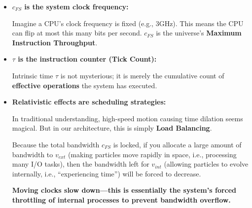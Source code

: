 \begin{itemize}
\item \textbf{$c_{FS}$ is the system clock frequency:}

    Imagine a CPU's clock frequency is fixed (e.g., 3GHz). This means the CPU can flip at most this many bits per second. \textbf{$c_{FS}$} is the universe's \textbf{Maximum Instruction Throughput}.

\item \textbf{$\tau$ is the instruction counter (Tick Count):}

    Intrinsic time \textbf{$\tau$} is not mysterious; it is merely the cumulative count of \textbf{effective operations} the system has executed.

\item \textbf{Relativistic effects are scheduling strategies:}

    In traditional understanding, high-speed motion causing time dilation seems magical. But in our architecture, this is simply \textbf{Load Balancing}.

    Because the total bandwidth \textbf{$c_{FS}$} is locked, if you allocate a large amount of bandwidth to \textbf{$v_{ext}$} (making particles move rapidly in space, i.e., processing many I/O tasks), then the bandwidth left for \textbf{$v_{int}$} (allowing particles to evolve internally, i.e., ``experiencing time'') will be forced to decrease.

    \textbf{Moving clocks slow down---this is essentially the system's forced throttling of internal processes to prevent bandwidth overflow.}
\end{itemize}


